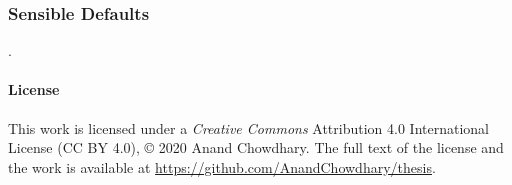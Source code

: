 \documentclass{article}
\begin{document}
\subsubsection{Sensible Defaults}

.

\begin{multicols}{2}



	
\end{multicols}

\listoffigures

\paragraph{License}

This work is licensed under a \emph{Creative Commons} Attribution 4.0 International License (CC BY 4.0), © 2020 Anand Chowdhary. The full text of the license and the work is available at \url{https://github.com/AnandChowdhary/thesis}.
\end{document}

